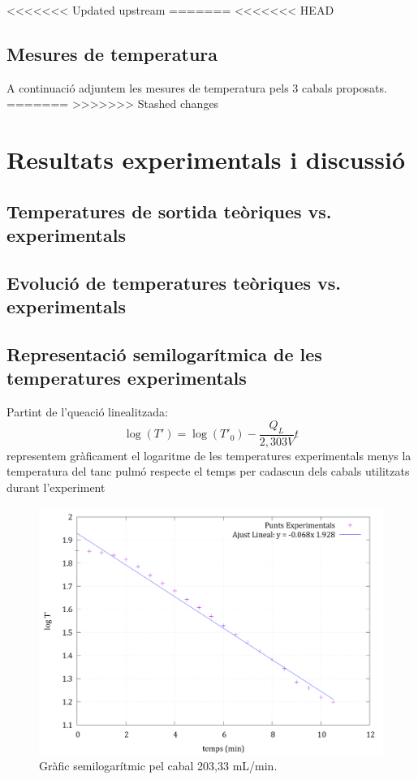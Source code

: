 \documentclass[10pt, twoside]{article}
\begin{document}
<<<<<<< Updated upstream
=======
<<<<<<< HEAD
\subsection{Mesures de temperatura}
A continuació adjuntem les mesures de temperatura pels 3 cabals proposats.
=======
>>>>>>> Stashed changes
\section{Resultats experimentals i discussió}

\subsection{Temperatures de sortida teòriques vs. experimentals}

\subsection{Evolució de temperatures teòriques vs. experimentals}

\subsection{Representació semilogarítmica de les temperatures experimentals}
Partint de l'queació linealitzada: 
\begin{equation}
    \log(T') = \log(T'_0) - \frac{Q_L}{2,303V} t
\end{equation}
representem gràficament el logaritme de les temperatures experimentals menys la temperatura del tanc pulmó respecte el temps per cadascun dels cabals utilitzats durant l'experiment

\begin{figure}[H]
    \centering
    \includegraphics[width=0.7\linewidth]{ajustsemilog203.png}
    \caption{Gràfic semilogarítmic pel cabal 203,33 mL/min.}
    \label{fig2}
\end{figure}
\end{document}
